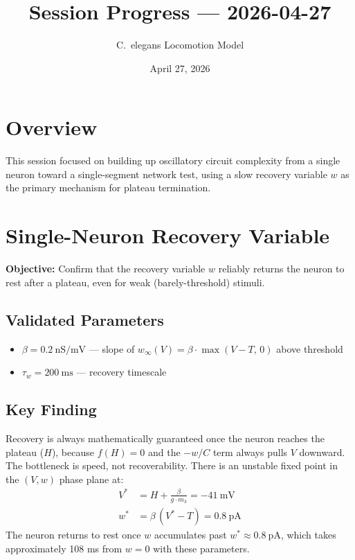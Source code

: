 \documentclass[11pt]{article}
\title{Session Progress --- 2026-04-27}
\author{C.~elegans Locomotion Model}
\date{April 27, 2026}
\begin{document}
\maketitle
\tableofcontents
\vspace{1em}

\section*{Overview}
This session focused on building up oscillatory circuit complexity from a single neuron toward a single-segment network test, using a slow recovery variable $w$ as the primary mechanism for plateau termination.

\section{Single-Neuron Recovery Variable}

\textbf{Objective:} Confirm that the recovery variable $w$ reliably returns the neuron to rest after a plateau, even for weak (barely-threshold) stimuli.

\subsection*{Validated Parameters}
\begin{itemize}
  \item $\beta = 0.2\ \text{nS/mV}$ --- slope of $w_\infty(V) = \beta \cdot \max(V - T,\, 0)$ above threshold
  \item $\tau_w = 200\ \text{ms}$ --- recovery timescale
\end{itemize}

\subsection*{Key Finding}
Recovery is always mathematically guaranteed once the neuron reaches the plateau ($H$), because $f(H) = 0$ and the $-w/C$ term always pulls $V$ downward. The bottleneck is speed, not recoverability. There is an unstable fixed point in the $(V, w)$ phase plane at:
\begin{align}
  V^* &= H + \frac{\beta}{g \cdot m_3} = -41\ \text{mV} \\
  w^* &= \beta\,(V^* - T) = 0.8\ \text{pA}
\end{align}
The neuron returns to rest once $w$ accumulates past $w^* \approx 0.8\ \text{pA}$, which takes approximately 108 ms from $w = 0$ with these parameters.
\end{document}
